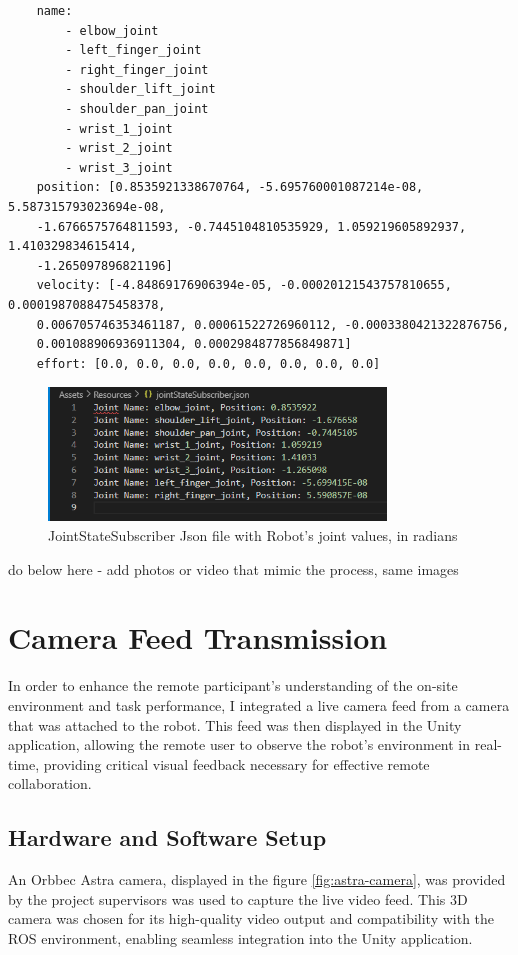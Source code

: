     
    \begin{verbatim}
    name:
        - elbow_joint
        - left_finger_joint
        - right_finger_joint
        - shoulder_lift_joint
        - shoulder_pan_joint
        - wrist_1_joint
        - wrist_2_joint
        - wrist_3_joint
    position: [0.8535921338670764, -5.695760001087214e-08, 5.587315793023694e-08, 
    -1.6766575764811593, -0.7445104810535929, 1.059219605892937, 1.410329834615414,
    -1.265097896821196]
    velocity: [-4.84869176906394e-05, -0.00020121543757810655, 0.0001987088475458378,
    0.006705746353461187, 0.00061522726960112, -0.0003380421322876756, 
    0.001088906936911304, 0.0002984877856849871]
    effort: [0.0, 0.0, 0.0, 0.0, 0.0, 0.0, 0.0, 0.0]
    \end{verbatim}
    
    \begin{figure}[h]
        \centering
        \includegraphics[width=0.8\textwidth]{figs/jsonJointStateSub.png}
        \caption{JointStateSubscriber Json file with Robot's joint values, in radians}
        \label{fig:json_joint_states}
    \end{figure}
    
    do below here - add photos or video that mimic the process, same images
    
    \section{Camera Feed Transmission}

    In order to enhance the remote participant's understanding of the on-site environment and task performance, I integrated a live camera feed from a camera that was attached to the robot. This feed was then displayed in the Unity application, allowing the remote user to observe the robot's environment in real-time, providing critical visual feedback necessary for effective remote collaboration.

    \subsection{Hardware and Software Setup}
    An Orbbec Astra camera, displayed in the figure \ref{fig:astra-camera}, was provided by the project supervisors was used to capture the live video feed. This 3D camera was chosen for its high-quality video output and compatibility with the ROS environment, enabling seamless integration into the Unity application.
    
